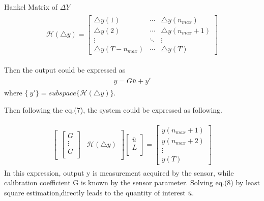 \documentclass[journal]{IEEEtran}
\begin{document}
Hankel Matrix of $\Delta Y$
\begin{align} 
	\begin{split}
		\mathcal{H}(\bigtriangleup y) =
 		\begin{bmatrix}
  			\bigtriangleup y(1)  & \cdots & \bigtriangleup y(n_{max}) \\
  			\bigtriangleup y(2)  & \cdots & \bigtriangleup y(n_{max}+1)\\
  			\vdots  & \ddots & \vdots  \\
 			 \bigtriangleup y(T-n_{max})  & \cdots & \bigtriangleup y(T)
 		\end{bmatrix}
	\end{split}
\end{align}

Then the output could be expressed as
\begin{align} 
	\begin{split}
	 y=G\bar{u}+y'
	 	\end{split}
\end{align}
where $\{\ y' \} = subspace\{\mathcal{H}(\bigtriangleup y)\}$\cite{sensor-cep}.

Then following the eq.(7), the system could be expressed as following.

\begin{align} 
	\begin{split}
		\begin{bmatrix}
  			\begin{bmatrix}
				G \\
				\vdots \\
				G \\
			\end{bmatrix}
			& \mathcal{H}(\bigtriangleup y)
 		\end{bmatrix} 
		\begin{bmatrix}
			\bar{u} \\
			L \\
		\end{bmatrix}
		=
 		\begin{bmatrix}
  			 y(n_{max}+1) \\
  			 y(n_{max}+2) \\
  			\vdots  \\
 			y(T)
 		\end{bmatrix}
	\end{split}
\end{align}
In this expression, output y is measurement acquired by the sensor, while calibration coefficient G is known by the sensor parameter. Solving eq.(8) by least square estimation,directly leads to the quantity of interest $\bar{u}$.  
\end{document}

